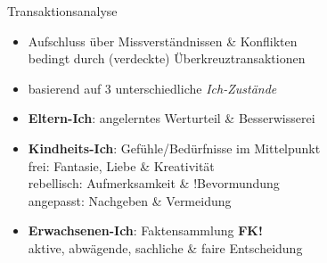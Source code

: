 \documentclass{cheatsheet}
\begin{document}
    \begin{warningbox}{Transaktionsanalyse}
        \begin{itemize}
            \item Aufschluss über Missverständnissen \& Konflikten\\
            \ra bedingt durch (verdeckte) Überkreuztransaktionen
            \item basierend auf 3 unterschiedliche \emph{Ich-Zustände}
            \item \textbf{Eltern-Ich}: angelerntes Werturteil \& Besserwisserei
            \item \textbf{Kindheits-Ich}:  Gefühle/Bedürfnisse im Mittelpunkt \\
            \ra frei: Fantasie, Liebe \&  Kreativität\\
            \ra rebellisch: Aufmerksamkeit \&  !Bevormundung\\
            \ra angepasst: Nachgeben \& Vermeidung
            \item \textbf{Erwachsenen-Ich}: Faktensammlung \la\ra \textbf{FK!}\\
            \ra aktive, abwägende, sachliche \& faire Entscheidung
        \end{itemize}
    \end{warningbox}
\end{document}
